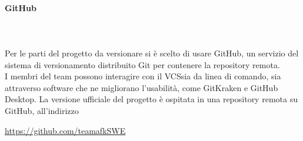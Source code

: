 \paragraph{GitHub}\mbox{} \\ \mbox{} \\
Per le parti del progetto da versionare si è scelto di usare GitHub\glo, un servizio del sistema di versionamento distribuito Git per contenere la repository remota. \\
I membri del team possono interagire con il VCS\glo sia da linea di comando, sia attraverso software che ne migliorano l'usabilità, come GitKraken e GitHub Desktop. La versione ufficiale del progetto è ospitata in una repository remota su GitHub, all'indirizzo \\
\centerline{\url{https://github.com/teamafkSWE}}

